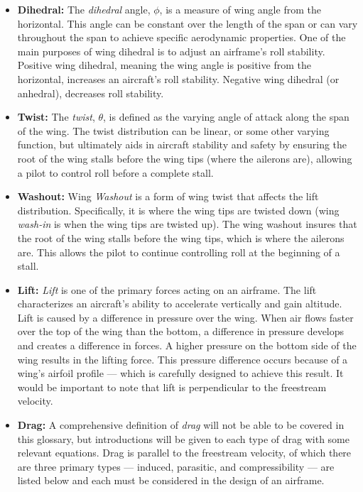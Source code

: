 \documentclass{article}
\begin{document}
\begin{itemize}
    \item[] \textbf{Dihedral:} The \textit{dihedral} angle, $\phi$, is a measure of wing angle from the horizontal. This angle can be constant over the length of the span
    or can vary throughout the span to achieve specific aerodynamic properties. One of the main purposes of wing dihedral is to adjust an airframe's
    roll stability. Positive wing dihedral, meaning the wing angle is positive from the horizontal, increases an aircraft's roll stability. Negative wing dihedral (or anhedral), 
    decreases roll stability.

    \item[] \textbf{Twist:} The \textit{twist}, $\theta$, is defined as the varying angle of attack along the span of the wing. The twist distribution can be linear, or some other
    varying function, but ultimately aids in aircraft stability and safety by ensuring the root of the wing stalls before the wing tips (where the ailerons are), allowing a pilot
    to control roll before a complete stall.
    
    \item[] \textbf{Washout:} Wing \textit{Washout} is a form of wing twist that affects the lift distribution. Specifically, it is where the wing tips are twisted down (wing \textit{wash-in}
    is when the wing tips are twisted up). The wing washout insures that the root of the wing stalls before the wing tips, which is where the ailerons are. This allows the pilot to continue
    controlling roll at the beginning of a stall.
    
    \item[] \textbf{Lift:} \textit{Lift} is one of the primary forces acting on an airframe. The lift characterizes an aircraft's ability to accelerate vertically and gain altitude.
    Lift is caused by a difference in pressure over the wing. When air flows faster over the top of the wing than the bottom, a difference in pressure develops and creates a difference
    in forces. A higher pressure on the bottom side of the wing results in the lifting force. This pressure difference occurs because of a wing's airfoil profile --- which is carefully
    designed to achieve this result. It would be important to note that lift is perpendicular to the freestream velocity.
    
    \item[] \textbf{Drag:}
    A comprehensive definition of \textit{drag} will not be able to be covered in this glossary, but  introductions will be given to each type of drag 
    with some relevant equations. Drag is parallel to the freestream velocity, of which there are three primary types --- induced, parasitic, and compressibility --- are listed below and each must be considered in the design of an airframe.
    

\end{itemize}
\end{document}
